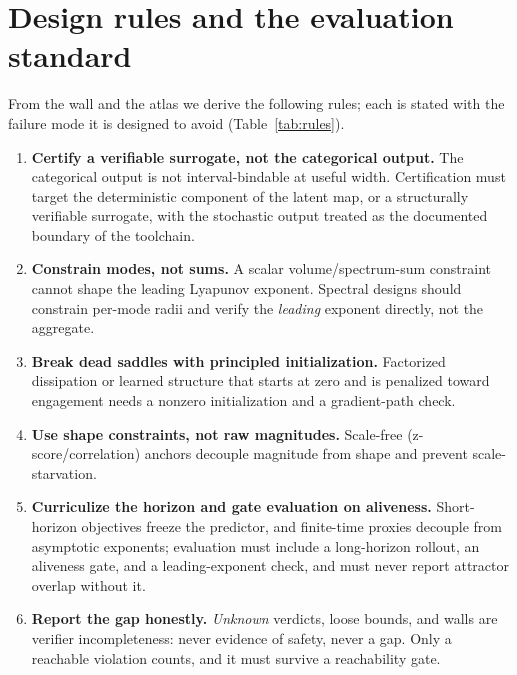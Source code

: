 \documentclass[11pt]{article}
\begin{document}
\section{Design rules and the evaluation standard}

From the wall and the atlas we derive the following rules; each is stated
with the failure mode it is designed to avoid (Table~\ref{tab:rules}).

\begin{enumerate}
\item \textbf{Certify a verifiable surrogate, not the categorical output.}
The categorical output is not interval-bindable at useful width. Certification
must target the deterministic component of the latent map, or a structurally
verifiable surrogate, with the stochastic output treated as the documented
boundary of the toolchain.
\item \textbf{Constrain modes, not sums.} A scalar volume/spectrum-sum
constraint cannot shape the leading Lyapunov exponent. Spectral designs
should constrain per-mode radii and verify the \emph{leading} exponent
directly, not the aggregate.
\item \textbf{Break dead saddles with principled initialization.} Factorized
dissipation or learned structure that starts at zero and is penalized toward
engagement needs a nonzero initialization and a gradient-path check.
\item \textbf{Use shape constraints, not raw magnitudes.} Scale-free
(z-score/correlation) anchors decouple magnitude from shape and prevent
scale-starvation.
\item \textbf{Curriculize the horizon and gate evaluation on aliveness.}
Short-horizon objectives freeze the predictor, and finite-time proxies
decouple from asymptotic exponents; evaluation must include a long-horizon
rollout, an aliveness gate, and a leading-exponent check, and must never
report attractor overlap without it.
\item \textbf{Report the gap honestly.} \emph{Unknown} verdicts, loose
bounds, and walls are verifier incompleteness: never evidence of safety,
never a gap. Only a reachable violation counts, and it must survive a
reachability gate.
\end{enumerate}
\end{document}
